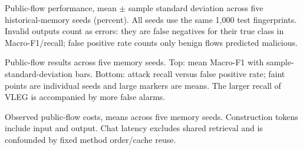 \caption{Public-flow performance, mean $\pm$ sample standard deviation across five historical-memory seeds (percent). All seeds use the same 1,000 test fingerprints. Invalid outputs count as errors: they are false negatives for their true class in Macro-F1/recall; false positive rate counts only benign flows predicted malicious.}

\caption{Public-flow results across five memory seeds. Top: mean Macro-F1 with sample-standard-deviation bars. Bottom: attack recall versus false positive rate; faint points are individual seeds and large markers are means. The larger recall of VLEG is accompanied by more false alarms.}

\caption{Observed public-flow costs, means across five memory seeds. Construction tokens include input and output. Chat latency excludes shared retrieval and is confounded by fixed method order/cache reuse.}
